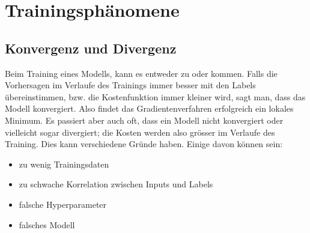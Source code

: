 \cite{Nielsen}

\section{Trainingsphänomene}

\subsection{Konvergenz und Divergenz}
Beim Training eines Modells, kann es entweder zu  oder  kommen.
Falls die Vorhersagen im Verlaufe des Trainings immer besser mit den Labels
übereinstimmen, bzw. die Kostenfunktion immer kleiner wird, sagt man, dass das
Modell konvergiert. Also findet das Gradientenverfahren erfolgreich ein lokales Minimum.
\para{}
Es passiert aber auch oft, dass ein Modell nicht konvergiert oder vielleicht
sogar divergiert; die Kosten werden also grösser im Verlaufe des Training.
Dies kann verschiedene Gründe haben. Einige davon können sein:
\begin{itemize}
\item{zu wenig Trainingsdaten}
\item{zu schwache Korrelation zwischen Inputs und Labels}
\item{falsche Hyperparameter}
\item{falsches Modell}
\end{itemize}


